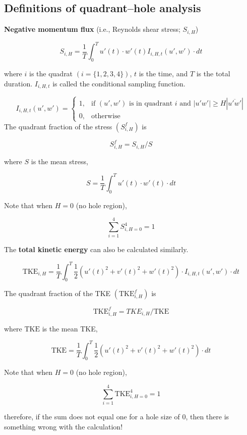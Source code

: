 \documentclass[10pt,]{article}
\begin{document}
\hypertarget{definitions-of-quadranthole-analysis}{%
\subsection{Definitions of quadrant--hole analysis}\label{definitions-of-quadranthole-analysis}}

\textbf{Negative momentum flux} (i.e., Reynolds shear stress; \(S_{i,H}\))

\[
S_{i,H} = \frac{1}{T} \int_0^T {u'(t)\cdot w'(t)}I_{i, H, t}(u',w')\cdot dt
\]

where \(i\) is the quadrat \((i = \{1,2,3,4\})\), \(t\) is the time, and \(T\) is the total duration. \(I_{i, H, t}\) is called the conditional sampling function.

\[
I_{i,H,t}(u',w') = \left \{\begin{array}{ll}
1, & \text{if } (u',w')\text{ is in quadrant }i\text{ and }|u'w'|  \ge H |\overline{u'w'}| \\
0, & \text{otherwise}
\end{array}\right .
\]
The quadrant fraction of the stress \((S_{i,H}^f)\) is

\[
S_{i,H}^f = S_{i,H} / S
\]

where \(S\) is the mean stress,

\[
S = \frac{1}{T} \int_0^T {u'(t)\cdot w'(t)}\cdot dt
\]

Note that when \(H = 0\) (no hole region),

\[
\sum_{i=1}^4 S_{i,H=0}^4 = 1
\]

The \textbf{total kinetic energy} can also be calculated similarly.

\[
\text{TKE}_{i,H} = \frac{1}{T} \int_0^T {\frac{1}{2}\left(u'(t)^2+v'(t)^2+ w'(t)^2\right)\cdot I_{i, H, t}(u',w')\cdot dt}
\]

The quadrant fraction of the TKE \((\text{TKE}_{i,H}^f)\) is

\[
\text{TKE}_{i,H}^f = TKE_{i,H} / \text{TKE}
\]

where \(\text{TKE}\) is the mean TKE,

\[
\text{TKE} = \frac{1}{T} \int_0^T {\frac{1}{2}\left(u'(t)^2+v'(t)^2+ w'(t)^2\right)\cdot dt}
\]

Note that when \(H = 0\) (no hole region),

\[
\sum_{i=1}^4 \text{TKE}_{i,H=0}^4 = 1
\]

therefore, if the sum does not equal one for a hole size of 0,
then there is something wrong with the calculation!
\end{document}
